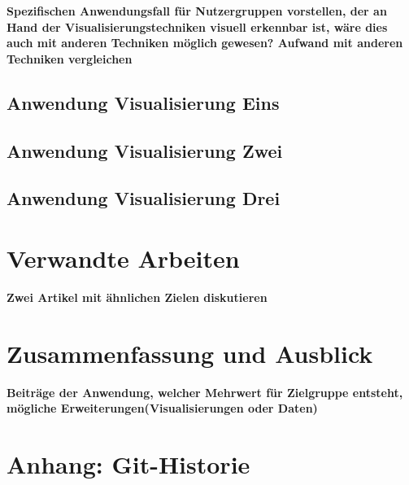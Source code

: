 \documentclass[usegeometry=true]{scrartcl}
\begin{document}
\textbf{Spezifischen Anwendungsfall für Nutzergruppen vorstellen, der an Hand der Visualisierungstechniken visuell erkennbar ist, wäre dies auch mit anderen Techniken möglich gewesen? Aufwand mit anderen Techniken vergleichen}
\subsection{Anwendung Visualisierung Eins}
\subsection{Anwendung Visualisierung Zwei}
\subsection{Anwendung Visualisierung Drei}

\section{Verwandte Arbeiten}
\textbf{Zwei Artikel mit ähnlichen Zielen diskutieren}
\section{Zusammenfassung und Ausblick}

\textbf{Beiträge der Anwendung, welcher Mehrwert für Zielgruppe entsteht, mögliche Erweiterungen(Visualisierungen oder Daten)}

\section*{Anhang: Git-Historie}

\printbibliography
\end{document}
